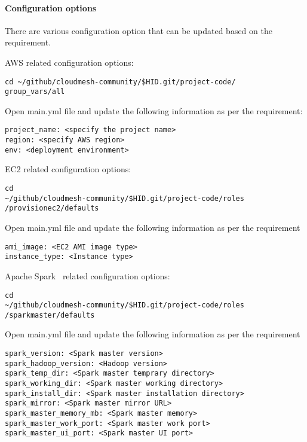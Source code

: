 \paragraph{Configuration options}

There are various configuration option that can be updated based on
the requirement.

AWS related configuration options:

\begin{verbatim}
cd ~/github/cloudmesh-community/$HID.git/project-code/
group_vars/all
\end{verbatim}

Open main.yml file and update the following information as per the
requirement:

\begin{verbatim}
project_name: <specify the project name>
region: <specify AWS region>
env: <deployment environment>
\end{verbatim}

EC2 related configuration options:

\begin{verbatim}
cd
~/github/cloudmesh-community/$HID.git/project-code/roles
/provisionec2/defaults
\end{verbatim}

Open main.yml file and update the following information as per the
requirement

\begin{verbatim}
ami_image: <EC2 AMI image type>
instance_type: <Instance type>
\end{verbatim}


Apache Spark~\cite{hid-sp18-511-www-spark} related configuration options:

\begin{verbatim}
cd
~/github/cloudmesh-community/$HID.git/project-code/roles
/sparkmaster/defaults
\end{verbatim}

Open main.yml file and update the following information as per the
requirement

\begin{verbatim}
spark_version: <Spark master version>
spark_hadoop_version: <Hadoop version>
spark_temp_dir: <Spark master temprary directory>
spark_working_dir: <Spark master working directory>
spark_install_dir: <Spark master installation directory>
spark_mirror: <Spark master mirror URL>
spark_master_memory_mb: <Spark master memory>
spark_master_work_port: <Spark master work port>
spark_master_ui_port: <Spark master UI port>
\end{verbatim}

